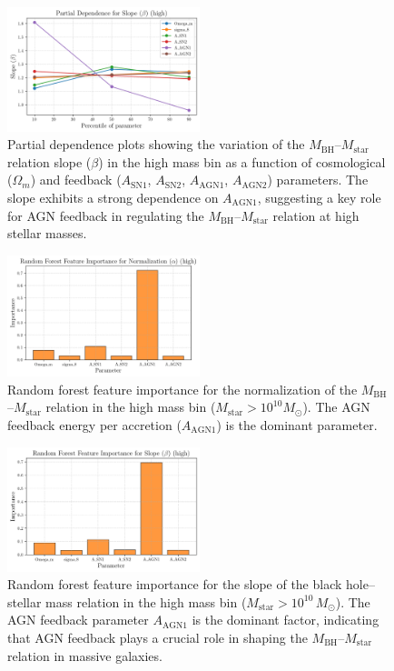 \documentclass[twocolumn]{aastex631}
\begin{document}
\begin{figure}[ht!]
    \centering
    \includegraphics[width=0.5\textwidth]{plots/pdp_Slope_beta_high_113_20250423_182618.png}
    \caption{Partial dependence plots showing the variation of the $M_\mathrm{BH}$--$M_\mathrm{star}$ relation slope ($\beta$) in the high mass bin as a function of cosmological ($\Omega_m$) and feedback ($A_\mathrm{SN1}$, $A_\mathrm{SN2}$, $A_\mathrm{AGN1}$, $A_\mathrm{AGN2}$) parameters. The slope exhibits a strong dependence on $A_\mathrm{AGN1}$, suggesting a key role for AGN feedback in regulating the $M_\mathrm{BH}$--$M_\mathrm{star}$ relation at high stellar masses.
}
    \label{fig:pdp_slope_high}
\end{figure}

\begin{figure}[ht!]
    \centering
    \includegraphics[width=0.5\textwidth]{plots/featimp_RandomForest_Normalization_alpha_high_114_20250423_182619.png}
    \caption{Random forest feature importance for the normalization of the $M_\mathrm{BH}$--$M_\mathrm{star}$ relation in the high mass bin ($M_\mathrm{star} > 10^{10} M_\odot$). The AGN feedback energy per accretion ($A_\mathrm{AGN1}$) is the dominant parameter.
}
    \label{fig:featimp_norm_high}
\end{figure}

\begin{figure}[ht!]
    \centering
    \includegraphics[width=0.5\textwidth]{plots/featimp_RandomForest_Slope_beta_high_111_20250423_182617.png}
    \caption{Random forest feature importance for the slope of the black hole--stellar mass relation in the high mass bin ($M_\mathrm{star}>10^{10}\,M_\odot$). The AGN feedback parameter $A_\mathrm{AGN1}$ is the dominant factor, indicating that AGN feedback plays a crucial role in shaping the $M_\mathrm{BH}$--$M_\mathrm{star}$ relation in massive galaxies.
}
    \label{fig:featimp_slope_random_high}
\end{figure}
\end{document}
